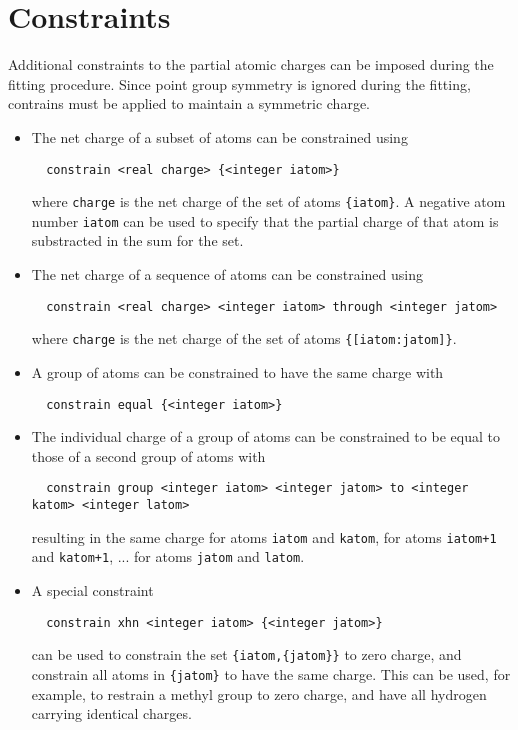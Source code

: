 \section{Constraints}
Additional constraints to the partial atomic charges can be imposed during
the fitting procedure.  Since point group symmetry is ignored during
the fitting, contrains must be applied to maintain a symmetric charge.
\begin{itemize}
\item
The net charge of a subset of atoms can be constrained using
\begin{verbatim}
  constrain <real charge> {<integer iatom>}
\end{verbatim}
where \verb+charge+ is the net charge of the set of atoms \verb+{iatom}+.
A negative atom number \verb+iatom+ can be used to specify that the
partial charge of that atom is substracted in the sum for the set.
\item
The net charge of a sequence of atoms can be constrained using
\begin{verbatim}
  constrain <real charge> <integer iatom> through <integer jatom>
\end{verbatim}
where \verb+charge+ is the net charge of the set of atoms \verb+{[iatom:jatom]}+.
\item
A group of atoms can be constrained to have the same charge with
\begin{verbatim}
  constrain equal {<integer iatom>}
\end{verbatim}
\item
The individual charge of a group of atoms can be constrained to be equal to
those of a second group of atoms with
\begin{verbatim}
  constrain group <integer iatom> <integer jatom> to <integer katom> <integer latom>
\end{verbatim}
resulting in the same charge for atoms \verb+iatom+ and \verb+katom+, for
atoms \verb.iatom+1. and \verb.katom+1., ... for atoms \verb+jatom+ and \verb+latom+.
\item
A special constraint
\begin{verbatim}
  constrain xhn <integer iatom> {<integer jatom>}
\end{verbatim}
can be used to constrain the set \verb+{iatom,{jatom}}+ to zero charge, and
constrain all atoms in \verb+{jatom}+ to have the same charge. This can be used,
for example, to restrain a methyl group to zero charge, and have all hydrogen
carrying identical charges.
\end{itemize}

